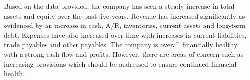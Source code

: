 

Based on the data provided, the company has seen a steady increase in total assets and equity over the past five years. Revenue has increased significantly as evidenced by an increase in cash, A/R, inventories, current assets and long-term debt. Expenses have also increased over time with increases in current liabilities, trade payables and other payables. The company is overall financially healthy with a strong cash flow and profits. However, there are areas of concern such as increasing provisions which should be addressed to ensure continued financial health.